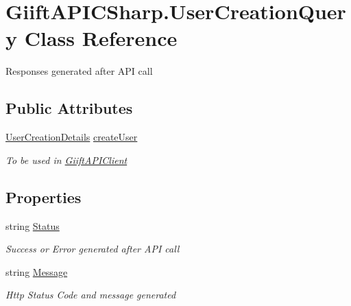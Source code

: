 \hypertarget{class_giift_a_p_i_c_sharp_1_1_user_creation_query}{}\section{Giift\+A\+P\+I\+C\+Sharp.\+User\+Creation\+Query Class Reference}
\label{class_giift_a_p_i_c_sharp_1_1_user_creation_query}


Responses generated after A\+PI call  


\subsection*{Public Attributes}
\begin{DoxyCompactItemize}
\item 
\hyperlink{class_giift_a_p_i_c_sharp_1_1_user_creation_details}{User\+Creation\+Details} \hyperlink{class_giift_a_p_i_c_sharp_1_1_user_creation_query_a03b4ef02d2716b48282a97a710606efc}{create\+User}
\begin{DoxyCompactList}\small\item\em To be used in \hyperlink{class_giift_a_p_i_c_sharp_1_1_giift_a_p_i_client}{Giift\+A\+P\+I\+Client} \end{DoxyCompactList}\end{DoxyCompactItemize}
\subsection*{Properties}
\begin{DoxyCompactItemize}
\item 
string \hyperlink{class_giift_a_p_i_c_sharp_1_1_user_creation_query_a9047d8e190092e890d6d39aa8138a4b6}{Status}
\begin{DoxyCompactList}\small\item\em Success or Error generated after A\+PI call \end{DoxyCompactList}\item 
string \hyperlink{class_giift_a_p_i_c_sharp_1_1_user_creation_query_a9f7544b217e2f156eb06cd997ea5e5cd}{Message}
\begin{DoxyCompactList}\small\item\em Http Status Code and message generated \end{DoxyCompactList}\end{DoxyCompactItemize}


